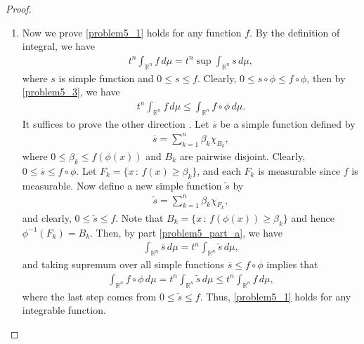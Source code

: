 \documentclass[11pt]{book}
\theoremstyle{definition}
\numberwithin{equation}{chapter}
\begin{document}
\begin{proof}
\begin{enumerate}[label=(\alph*)]
    \item Now we prove \eqref{problem5_1} holds for any function $f$. By the definition of integral, we have
    \begin{align}\label{problem5_3}
        t^n \int_{\mathbb{R}^n} f\,d\mu = t^n \sup \int_{\mathbb{R}^n} s\,d\mu,
    \end{align}
    where $s$ is simple function and $0 \leq s \leq f$. Clearly, $0 \leq s \circ \phi \leq f \circ \phi$, then by \eqref{problem5_3}, we have
    \begin{align*}
        t^n \int_{\mathbb{R}^n} f\,d\mu \leq \int_{\mathbb{R}^n} f \circ \phi \,d\mu.
    \end{align*}
    It suffices to prove the other direction \cite{41}. Let $\overline{s}$ be a simple function defined by
    \begin{align*}
        \overline{s} = \sum^n_{k=1} \beta_k \chi_{B_k},
    \end{align*}
    where $0 \leq \beta_k \leq f(\phi(x))$ and $B_k$ are pairwise disjoint. Clearly, $0 \leq \overline{s} \leq f \circ \phi$. Let $F_k = \{x \,:\, f(x) \geq \beta_k\}$, and each $F_k$ is measurable since $f$ is measurable. Now define a new simple function $\widetilde{s}$ by
    \begin{align*}
        \widetilde{s} = \sum^n_{k=1} \beta_k \chi_{F_k},
    \end{align*}
    and clearly, $0 \leq \widetilde{s} \leq f$. Note that $B_k = \{x \,:\, f(\phi(x)) \geq \beta_k\}$ and hence $\phi^{-1}(F_k) = B_k$. Then, by part \ref{problem5_part_a}, we have
    \begin{align*}
        \int_{\mathbb{R}^n} \overline{s}\,d\mu = t^n \int_{\mathbb{R}^n} \widetilde{s} \,d\mu,
    \end{align*}
    and taking supremum over all simple functions $\overline{s} \leq f \circ \phi$ implies that
    \begin{align*}
        \int_{\mathbb{R}^n} f \circ \phi \,d\mu = t^n \int_{\mathbb{R}^n} \widetilde{s} \,d\mu \leq t^n \int_{\mathbb{R}^n} f\,d\mu,
    \end{align*}
    where the last step comes from $0 \leq \widetilde{s} \leq f$. Thus, \eqref{problem5_1} holds for any integrable function.%
\end{enumerate}

\end{proof}
\end{document}
